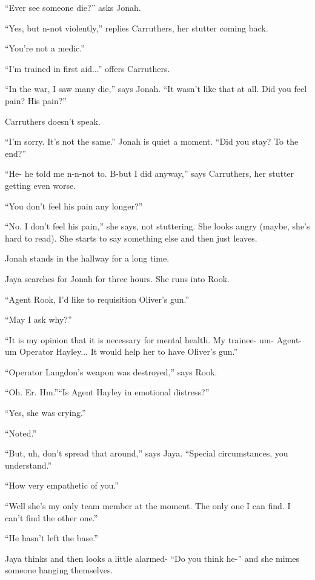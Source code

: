 ``Ever see someone die?'' asks Jonah.

``Yes, but n-not violently,'' replies Carruthers, her stutter coming back.

``You're not a medic.''

``I'm trained in first aid...'' offers Carruthers.

``In the war, I saw many die,'' says Jonah.  ``It wasn't like that at all.  Did you feel pain? His pain?''

Carruthers doesn't speak.

``I'm sorry.  It's not the same.''  Jonah is quiet a moment.  ``Did you stay?  To the end?''

``He- he told me n-n-not to.  B-but I did anyway,'' says Carruthers, her stutter getting even worse.

``You don't feel his pain any longer?''

``No.  I don't feel his pain,'' she says, not stuttering.  She looks angry (maybe, she's hard to read).  She starts to say something else and then just leaves.

Jonah stands in the hallway for a long time.





Jaya searches for Jonah for three hours.  She runs into Rook.

``Agent Rook, I'd like to requisition Oliver's gun.''

``May I ask why?''

``It is my opinion that it is necessary for mental health.  My trainee- um- Agent- um Operator Hayley... It would help her to have Oliver's gun.''

``Operator Langdon's weapon was destroyed,'' says Rook.

``Oh.  Er.  Hm.''``Is Agent Hayley in emotional distress?''

``Yes, she was crying.''

``Noted.''

``But, uh, don't spread that around,'' says Jaya.  ``Special circumstances, you understand.''

``How very empathetic of you.''

``Well she's my only team member at the moment.  The only one I can find.  I can't find the other one.''

``He hasn't left the base.''

Jaya thinks and then looks a little alarmed- ``Do you think he-'' and she mimes someone hanging themselves.

